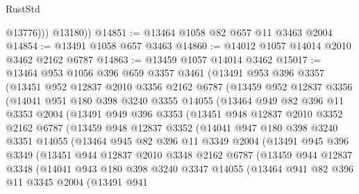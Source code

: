 \begin{lexlean}{RustStd}
\begin{coremodule}
              @13776)))
        @13180))
@14851 := @13464 @1058 @82 @657 @11 @3463 @2004
@14854 := @13491 @1058 @657 @3463
@14860 := @14012 @1057 @14014 @2010 @3462 @2162 @6787
@14863 := @13459 @1057 @14014 @3462
@15017 := @13464
    @953
    @1056
    @396
    @659
    @3357
    @3461
    (@13491
      @953
      @396
      @3357
      (@13451
        @952
        @12837
        @2010
        @3356
        @2162
        @6787
        (@13459
          @952
          @12837
          @3356
          (@14041
            @951
            @180
            @398
            @3240
            @3355
            @14055
            (@13464
              @949
              @82
              @396
              @11
              @3353
              @2004
              (@13491
                @949
                @396
                @3353
                (@13451
                  @948
                  @12837
                  @2010
                  @3352
                  @2162
                  @6787
                  (@13459
                    @948
                    @12837
                    @3352
                    (@14041
                      @947
                      @180
                      @398
                      @3240
                      @3351
                      @14055
                      (@13464
                        @945
                        @82
                        @396
                        @11
                        @3349
                        @2004
                        (@13491
                          @945
                          @396
                          @3349
                          (@13451
                            @944
                            @12837
                            @2010
                            @3348
                            @2162
                            @6787
                            (@13459
                              @944
                              @12837
                              @3348
                              (@14041
                                @943
                                @180
                                @398
                                @3240
                                @3347
                                @14055
                                (@13464
                                  @941
                                  @82
                                  @396
                                  @11
                                  @3345
                                  @2004
                                  (@13491
                                    @941

\end{coremodule}
\end{lexlean}

